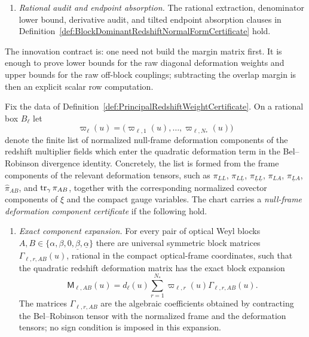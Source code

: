 \begin{definition}
\begin{enumerate}
    \item \emph{Rational audit and endpoint absorption.}  The rational extraction,
    denominator lower bound, derivative audit, and tilted endpoint absorption
    clauses in Definition~\ref{def:BlockDominantRedshiftNormalFormCertificate}
    hold.
\end{enumerate}
The innovation contract is: one need not build the margin matrix first.  It is
enough to prove lower bounds for the raw diagonal deformation weights and upper
bounds for the raw off-block couplings; subtracting the overlap margin is then
an explicit scalar row computation.
\end{definition}

\begin{definition}\label{def:NullFrameDeformationComponentCertificate}
Fix the data of Definition~\ref{def:PrincipalRedshiftWeightCertificate}.  On a
rational box $B_\ell$ let
\[
    \varpi_\ell(u)
    =
    \bigl(\varpi_{\ell,1}(u),\ldots,\varpi_{\ell,N_*}(u)\bigr)
\]
denote the finite list of normalized null-frame deformation components of the
redshift multiplier fields which enter the quadratic deformation term in the
Bel--Robinson divergence identity.  Concretely, the list is formed from the
frame components of the relevant deformation tensors, such as
$\pi_{LL}$, $\pi_{L\underline L}$, $\pi_{\underline L\underline L}$,
$\pi_{LA}$, $\pi_{\underline L A}$, $\hat\pi_{AB}$, and
$\operatorname{tr}_\gamma\pi_{AB}$, together with the corresponding normalized covector
components of $\xi$ and the compact gauge variables.  The chart carries a
\emph{null-frame deformation component certificate} if the following hold.
\begin{enumerate}
    \item \emph{Exact component expansion.}  For every pair of optical Weyl
    blocks
    $A,B\in\{\alpha,\beta,0,\underline\beta,\underline\alpha\}$ there are
    universal symmetric block matrices
    $\Gamma_{\ell,r,AB}(u)$, rational in the compact optical-frame coordinates,
    such that the quadratic redshift deformation matrix has the exact
    block expansion
    \[
        \mathsf M_{\ell,AB}(u)
        =
        d_\ell(u)
        \sum_{r=1}^{N_*}
        \varpi_{\ell,r}(u)\Gamma_{\ell,r,AB}(u).
    \]
    The matrices $\Gamma_{\ell,r,AB}$ are the algebraic coefficients obtained
    by contracting the Bel--Robinson tensor with the normalized frame and the
    deformation tensors; no sign condition is imposed in this expansion.


\end{enumerate}
\end{definition}
